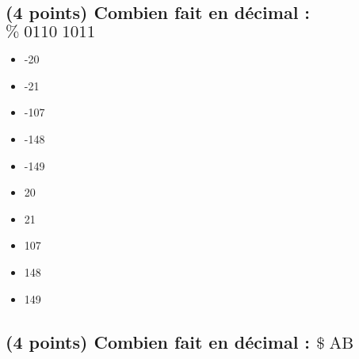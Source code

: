 \documentclass[11pt,a4paper]{article}
\begin{document}
\bigskip


\subsection{(4 points) Combien fait en décimal : $ \% \; 0110 \; 1011 $ }

\begin{table}[h!]
  \centering
  \begin{minipage}{0.45\textwidth}
\begin{itemize}
  \item[\CaseCoche] -20    \phantom{(} \\
  \item[\CaseCoche] -21    \phantom{(} \\
  \item[\CaseCoche] -107   \phantom{(} \\
  \item[\CaseCoche] -148   \phantom{(} \\
  \item[\CaseCoche] -149   \phantom{(} \\
\end{itemize}
  \end{minipage}
  \hfillx
  \begin{minipage}{0.45\textwidth}
    \centering
\begin{itemize}
  \item[\CaseCoche] 20     \phantom{(} \\
  \item[\CaseCoche] 21     \phantom{(} \\
  \item[\CaseCoche] 107    \phantom{(} \\  %
  \item[\CaseCoche] 148    \phantom{(} \\
  \item[\CaseCoche] 149    \phantom{(} \\
\end{itemize}
  \end{minipage}
\end{table}


\bigskip


\subsection{(4 points) Combien fait en décimal : $ \$ \; \text{AB} $ }
\end{document}
